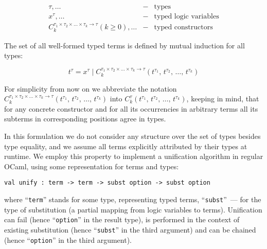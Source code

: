 $$
\begin{array}{rcl}
  \tau,\dots&-&\mbox{types}\\
  x^\tau,\dots&-&\mbox{typed logic variables}\\
  C_k^{\tau_1\times\tau_2\times\dots\times\tau_k\to\tau} (k\ge 0),\dots&-&\mbox{typed constructors}
\end{array}
$$

The set of all well-formed typed terms is defined by mutual induction for all types:

$$
t^\tau=x^\tau\mid C_k^{\tau_1\times\tau_2\times\dots\times\tau_k\to\tau}(t^{\tau_1},\,t^{\tau_2},\,\dots,\,t^{\tau_k})
$$

For simplicity from now on we abbreviate the notation $C_k^{\tau_1\times\tau_2\times\dots\times\tau_k\to\tau}(t^{\tau_1},\,t^{\tau_2},\,\dots,\,t^{\tau_k})$ into 
$C_k^\tau(t^{\tau_1},\,t^{\tau_2},\,\dots,\,t^{\tau_k})$, keeping in mind, that for any concrete constructor and for all its occurrencies 
in arbitrary terms all its subterms in corresponding positions agree in types. 

\begin{comment}
We need also to define the notion of a subterm  $t^\tau[p]$ of a term $t^\tau$ at given position $p$:

$$
\begin{array}{rcl}
 p=\epsilon\mid\{1, 2, 3,\dots\}\bullet p&-&\mbox{the set of positions}\\
 t^\tau[\epsilon]=t^\tau&-&\mbox{base case}\\
 C_k^\tau(t_1^{\tau_1},\,t_2^{\tau_2},\dots,\,t_k^{\tau_k})[i\bullet p]=t_i^{\tau_i}[p], 1\le i \le k&-&\mbox{inductive case}
\end{array}
$$
\end{comment}

In this formulation we do not consider any structure over the set of types besides type equality, and we assume all terms explicitly 
attributed by their types at runtime. We employ this property to implement a unification algorithm in regular OCaml, using some
representation for terms and types:

\begin{lstlisting}[mathescape=true]
    val unify : term -> term -> subst option -> subst option
\end{lstlisting}

\noindent where ``\lstinline{term}'' stands for some type, representing typed terms, ``\lstinline{subst}''~--- for the type of 
substitution (a partial mapping from logic variables to terms). Unification can fail (hence ``\lstinline{option}'' in the result type), 
is performed in the context of existing substitution (hence ``\lstinline{subst}'' in the third argument) and can be 
chained (hence ``\lstinline{option}'' in the third argument). 

